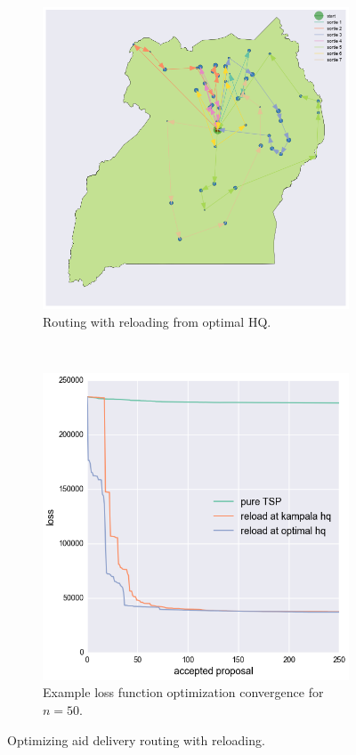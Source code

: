 \documentclass{article} %
\begin{document}
\begin{figure}
  \centering
  \begin{subfigure}[b]{0.5\columnwidth}
    \centering
    \includegraphics[width=\textwidth]{figures/routing-reloading-hq-optimal}
    \caption{Routing with reloading from optimal HQ.}
    \label{fig:routing-reloading-hq-optimal}
  \end{subfigure}~\begin{subfigure}[b]{0.46\columnwidth}
    \centering
    \centering
    \includegraphics[width=\textwidth]{figures/comparative-loss-plot}
    \caption{Example loss function optimization convergence for $n=50$.}
    \label{fig:comparative-loss-plot}
  \end{subfigure}
  \caption{Optimizing aid delivery routing with reloading.}
\end{figure}
\end{document}
